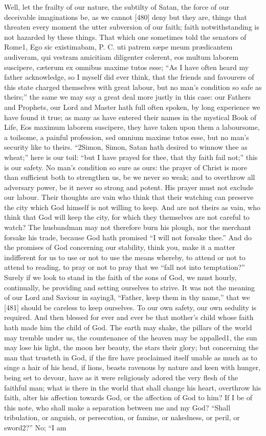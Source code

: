 Well, let the frailty of our nature, the subtilty of Satan, the force of our deceivable imaginations be, as we cannot [480] deny but they are, things that threaten every moment the utter subversion of our faith; faith notwithstanding is not hazarded by these things. That which one sometimes told the senators of Rome1, Ego sic existimabam, P. C. uti patrem sæpe meum prædicantem audiveram, qui vestram amicitiam diligenter colerent, eos multum laborem suscipere, cæterum ex omnibus maxime tutos esse; “As I have often heard my father acknowledge, so I myself did ever think, that the friends and favourers of this state charged themselves with great labour, but no man’s condition so safe as theirs;” the same we may say a great deal more justly in this case: our Fathers and Prophets, our Lord and Master hath full often spoken, by long experience we have found it true; as many as have entered their names in the mystical Book of Life, Eos maximum laborem suscipere, they have taken upon them a laboursome, a toilsome, a painful profession, sed omnium maxime tutos esse, but no man’s security like to theirs. “2Simon, Simon, Satan hath desired to winnow thee as wheat;” here is our toil: “but I have prayed for thee, that thy faith fail not;” this is our safety. No man’s condition so sure as ours: the prayer of Christ is more than sufficient both to strengthen us, be we never so weak; and to overthrow all adversary power, be it never so strong and potent. His prayer must not exclude our labour. Their thoughts are vain who think that their watching can preserve the city which God himself is not willing to keep. And are not theirs as vain, who think that God will keep the city, for which they themselves are not careful to watch? The husbandman may not therefore burn his plough, nor the merchant forsake his trade, because God hath promised “I will not forsake thee.” And do the promises of God concerning our stability, think you, make it a matter indifferent for us to use or not to use the means whereby, to attend or not to attend to reading, to pray or not to pray that we “fall not into temptation?” Surely if we look to stand in the faith of the sons of God, we must hourly, continually, be providing and setting ourselves to strive. It was not the meaning of our Lord and Saviour in saying3, “Father, keep them in thy name,” that we [481] should be careless to keep ourselves. To our own safety, our own sedulity is required. And then blessed for ever and ever be that mother’s child whose faith hath made him the child of God. The earth may shake, the pillars of the world may tremble under us, the countenance of the heaven may be appalled1, the sun may lose his light, the moon her beauty, the stars their glory; but concerning the man that trusteth in God, if the fire have proclaimed itself unable as much as to singe a hair of his head, if lions, beasts ravenous by nature and keen with hunger, being set to devour, have as it were religiously adored the very flesh of the faithful man; what is there in the world that shall change his heart, overthrow his faith, alter his affection towards God, or the affection of God to him? If I be of this note, who shall make a separation between me and my God? “Shall tribulation, or anguish, or persecution, or famine, or nakedness, or peril, or sword2?” No; “I am 